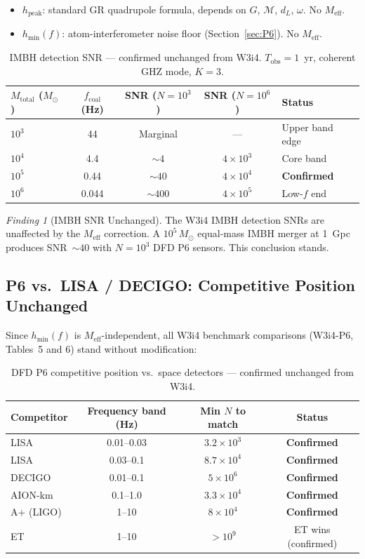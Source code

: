 \documentclass[11pt]{article}
\theoremstyle{definition}
\theoremstyle{remark}
\newtheorem{finding}[theorem]{Finding}
\newcommand{\ee}[1]{\times10^{#1}}
\newcommand{\Meff}{M_{\mathrm{eff}}}
\newcommand{\Msun}{M_\odot}
\begin{document}
\begin{itemize}
\item $h_{\mathrm{peak}}$: standard GR quadrupole formula,
  depends on $G$, $\mathcal{M}$, $d_L$, $\omega$. No $\Meff$.
\item $h_{\min}(f)$: atom-interferometer noise floor (Section~\ref{sec:P6}).
  No $\Meff$.
\end{itemize}

\begin{table}[h]
\centering
\caption{IMBH detection SNR --- confirmed unchanged from W3i4.
$T_{\mathrm{obs}} = 1$~yr, coherent GHZ mode, $K=3$.}
\label{tab:IMBH-SNR}
\begin{tabular}{@{}lcccl@{}}
\toprule
$M_{\mathrm{total}}$ ($\Msun$) & $f_{\mathrm{coal}}$ (Hz)
& SNR ($N=10^3$) & SNR ($N=10^6$) & Status \\
\midrule
$10^3$ & 44   & Marginal & ---     & Upper band edge \\
$10^4$ & 4.4  & $\sim 4$ & $4\ee{3}$ & Core band \\
$10^5$ & 0.44 & $\sim 40$ & $4\ee{4}$ & \textbf{Confirmed} \\
$10^6$ & 0.044 & $\sim 400$ & $4\ee{5}$ & Low-$f$ end \\
\bottomrule
\end{tabular}
\end{table}

\begin{finding}[IMBH SNR Unchanged]
\label{finding:IMBH}
The W3i4 IMBH detection SNRs are unaffected by the $\Meff$ correction.
A $10^5\,\Msun$ equal-mass IMBH merger at 1~Gpc produces
SNR~$\sim 40$ with $N=10^3$ DFD P6 sensors. This conclusion stands.
\end{finding}

\subsection{P6 vs.\ LISA / DECIGO: Competitive Position Unchanged}

Since $h_{\min}(f)$ is $\Meff$-independent, all W3i4 benchmark comparisons
(W3i4-P6, Tables~5 and 6) stand without modification:

\begin{table}[h]
\centering
\caption{DFD P6 competitive position vs.\ space detectors --- confirmed
unchanged from W3i4.}
\label{tab:competitive}
\begin{tabular}{@{}lccc@{}}
\toprule
Competitor & Frequency band (Hz) & Min $N$ to match & Status \\
\midrule
LISA       & 0.01--0.03 & $3.2\ee{3}$ & \textbf{Confirmed} \\
LISA       & 0.03--0.1  & $8.7\ee{4}$ & \textbf{Confirmed} \\
DECIGO     & 0.01--0.1  & $5\ee{6}$   & \textbf{Confirmed} \\
AION-km    & 0.1--1.0   & $3.3\ee{4}$ & \textbf{Confirmed} \\
A+ (LIGO)  & 1--10      & $8\ee{4}$   & \textbf{Confirmed} \\
ET         & 1--10      & $>10^9$     & ET wins (confirmed) \\
\bottomrule
\end{tabular}
\end{table}
\end{document}
